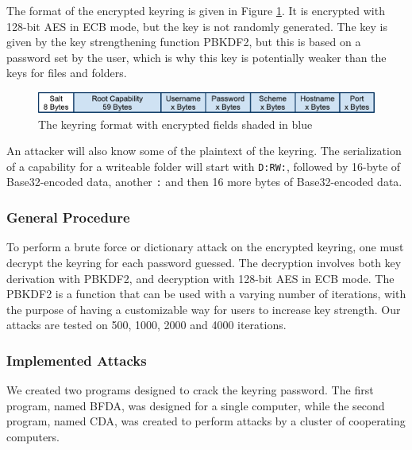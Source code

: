 \documentclass[pdftex,english,10pt,b5paper,twoside]{book}
\begin{document}
The format of the encrypted keyring is given in Figure \ref{fig:KeyringFormat}.
It is encrypted with 128-bit \ac{AES} in \ac{ECB} mode, but the key is not
randomly generated. The key is given by the key strengthening function
\ac{PBKDF2}, but this is based on a password set by the user, which is why this
key is potentially weaker than the keys for files and folders.

\begin{figure}[h!]
    \centering
    \includegraphics[scale=0.6]{KeyringFormat.pdf}
    \caption{The keyring format with encrypted fields shaded in blue}
    \label{fig:KeyringFormat}
\end{figure}

An attacker will also know some of the plaintext of the keyring. The
serialization of a capability for a writeable folder will
start with \texttt{D:RW:}, followed by 16-byte of Base32-encoded data, another
\texttt{:} and then 16 more bytes of Base32-encoded data.

\subsubsection{General Procedure}

To perform a brute force or dictionary attack on the encrypted keyring, one
must decrypt the keyring for each password guessed. The decryption involves
both key derivation with \ac{PBKDF2}, and decryption with 128-bit \ac{AES} in
\ac{ECB} mode. The \ac{PBKDF2} is a function that can be used with a
varying number of iterations, with the purpose of having a customizable way for
users to increase key strength. Our attacks are tested on 500, 1000, 2000 and
4000 iterations.


\subsubsection{Implemented Attacks}

We created two programs designed to crack the keyring password. The first
program, named \ac{BFDA}, was designed for a single computer, while the second
program, named \ac{CDA}, was created to perform attacks by a cluster of
cooperating computers.
\end{document}
